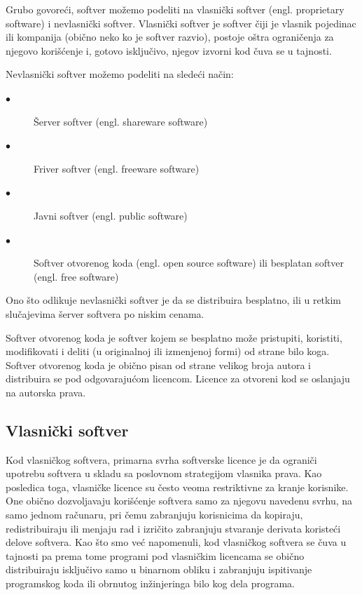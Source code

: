 \documentclass[a4paper]{article}
\begin{document}
Grubo govoreći, softver možemo podeliti na vlasnički softver (engl. proprietary software)
i nevlasnički softver. Vlasnički softver je softver čiji je vlasnik pojedinac ili kompanija
(obično neko ko je softver razvio), postoje oštra ograničenja za njegovo korišćenje i,
gotovo isključivo, njegov izvorni kod čuva se u tajnosti.

Nevlasnički softver možemo podeliti na sledeći način:
    \begin{description}
        \item[$\bullet$] Šerver softver (engl. shareware software)
        \item[$\bullet$] Friver softver (engl. freeware software)
        \item[$\bullet$] Javni softver (engl. public software)
        \item[$\bullet$] Softver otvorenog koda (engl. open source software) ili besplatan softver (engl. free software) 
    \end{description}
Ono što odlikuje nevlasnički softver je da se distribuira besplatno, ili u retkim slučajevima šerver 
softvera po niskim cenama. \cite{free_philosophy}

Softver otvorenog koda je softver kojem se besplatno može pristupiti, koristiti, modifikovati i deliti
(u originalnoj ili izmenjenoj formi) od strane bilo koga. Softver otvorenog koda je obično pisan od strane velikog
broja autora i distribuira se pod odgovarajućom licencom. Licence za otvoreni kod se oslanjaju na autorska
prava. \cite{free_philosophy}

\subsection{Vlasnički softver}
\label{vlasnicki_softver}

Kod vlasničkog softvera, primarna svrha softverske licence je da ograniči
upotrebu softvera u skladu sa 
poslovnom strategijom vlasnika prava. Kao posledica toga, vlasničke licence su često veoma restriktivne za 
kranje korisnike. One obično dozvoljavaju korišćenje softvera samo za njegovu navedenu svrhu, na samo jednom
računaru, pri čemu zabranjuju korisnicima da kopiraju, redistribuiraju ili menjaju rad i izričito zabranjuju
stvaranje derivata koristeći delove softvera.
Kao što smo već napomenuli, kod vlasničkog softvera se čuva u tajnosti pa prema tome programi pod 
vlasničkim licencama se obično distribuiraju isključivo samo u binarnom obliku i zabranjuju ispitivanje
programskog koda ili obrnutog inžinjeringa bilo kog dela programa.
\end{document}
